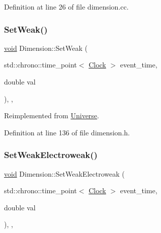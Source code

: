Definition at line 26 of file dimension.\+cc.

\mbox{\label{class_dimension_a157cfa28dd6bc5518d622d01445ca827}} 
\subsubsection{\texorpdfstring{Set\+Weak()}{SetWeak()}}
{\footnotesize\ttfamily \mbox{\hyperlink{glad_8h_a950fc91edb4504f62f1c577bf4727c29}{void}} Dimension\+::\+Set\+Weak (\begin{DoxyParamCaption}\item[{std\+::chrono\+::time\+\_\+point$<$ \mbox{\hyperlink{universe_8h_a0ef8d951d1ca5ab3cfaf7ab4c7a6fd80}{Clock}} $>$}]{event\+\_\+time,  }\item[{double}]{val }\end{DoxyParamCaption})\hspace{0.3cm}{\ttfamily [inline]}, {\ttfamily [final]}, {\ttfamily [virtual]}}



Reimplemented from \mbox{\hyperlink{class_universe_a0f5cd04081b41ee931c0557dc397f6fb}{Universe}}.



Definition at line 136 of file dimension.\+h.

\mbox{\label{class_dimension_a1d2accef9e6adf747f5cc143ae4527c9}} 
\subsubsection{\texorpdfstring{Set\+Weak\+Electroweak()}{SetWeakElectroweak()}}
{\footnotesize\ttfamily \mbox{\hyperlink{glad_8h_a950fc91edb4504f62f1c577bf4727c29}{void}} Dimension\+::\+Set\+Weak\+Electroweak (\begin{DoxyParamCaption}\item[{std\+::chrono\+::time\+\_\+point$<$ \mbox{\hyperlink{universe_8h_a0ef8d951d1ca5ab3cfaf7ab4c7a6fd80}{Clock}} $>$}]{event\+\_\+time,  }\item[{double}]{val }\end{DoxyParamCaption})\hspace{0.3cm}{\ttfamily [inline]}, {\ttfamily [final]}, {\ttfamily [virtual]}}



